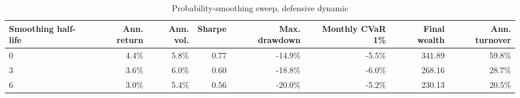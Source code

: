 ﻿\begin{table}[!htbp]
\centering
\caption{Probability-smoothing sweep, defensive dynamic}
\label{tab:allocation-smoothing-defensive}
\small
\setlength{\tabcolsep}{5pt}
\renewcommand{\arraystretch}{1.12}
\begin{adjustbox}{center,max width=\linewidth}
\begin{tabular}{lrrrrrrr}
\toprule
Smoothing half-life & Ann. return & Ann. vol. & Sharpe & Max. drawdown & Monthly CVaR 1\% & Final wealth & Ann. turnover \\
\midrule
0 & 4.4\% & 5.8\% & 0.77 & -14.9\% & -5.5\% & 341.89 & 59.8\% \\
3 & 3.6\% & 6.0\% & 0.60 & -18.8\% & -6.0\% & 268.16 & 28.7\% \\
6 & 3.0\% & 5.4\% & 0.56 & -20.0\% & -5.2\% & 230.13 & 20.5\% \\
\bottomrule
\end{tabular}
\end{adjustbox}
\end{table}
